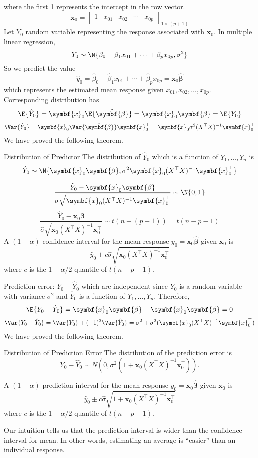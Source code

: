 where the first 1 represents the intercept in the row vector.
\[ \symbf{x}_0=\begin{bmatrix}
        1 & x_{01} & x_{02} & \cdots & x_{0p}
    \end{bmatrix}_{1\times (p+1)} \]
Let $ Y_0 $ random variable representing the response
associated with $ \symbf{x}_0 $. In multiple linear regression,
\[ Y_0 \sim \N{\beta_0+\beta_1x_{01}+\cdots+\beta_p x_{0p},\sigma^2} \]
So we predict the value
\[ \hat{y}_0=\hat{\beta}_0+\hat{\beta}_1x_{01}+\cdots+
    \hat{\beta}_p x_{0p}=\symbf{x}_0\hat{\symbf{\beta}} \]
which represents the estimated mean response given
$ x_{01},x_{02},\ldots,x_{0p} $. Corresponding distribution
has
\[ \E{\hat{Y}_0}=\symbf{x}_0\E{\hat{\symbf{\beta}}}=\symbf{x}_0\symbf{\beta}
    =\E{Y_0} \]
\[ \Var{\hat{Y}_0}=\symbf{x}_0\Var{\hat{\symbf{\beta}}}\symbf{x}_0^\top=
    \symbf{x}_0\sigma^2(X^\top X)^{-1}\symbf{x}_0^\top \]
We have proved the following theorem.
\begin{Theorem}{Distribution of Predictor}{}
    The distribution of $ \hat{Y}_0 $ which is a function
    of $ Y_1,\ldots,Y_n $ is
    \[ \hat{Y}_0 \sim \N{\symbf{x}_0\symbf{\beta},\sigma^2\symbf{x}_0(X^\top X)^{-1}
            \symbf{x}_0^\top} \]
\end{Theorem}
\[ \frac{\hat{Y}_0-\symbf{x}_0\symbf{\beta}}{\sigma\sqrt{
            \symbf{x}_0(X^\top X)^{-1}\symbf{x}_0^\top
        }}\sim \N{0,1}  \]
\[ \frac{\hat{Y}_0-\symbf{x}_0\symbf{\beta}}{\hat{\sigma}\sqrt{
            \symbf{x}_0(X^\top X)^{-1}\symbf{x}_0^\top
        }}\sim t(n-(p+1))=t(n-p-1)  \]
A $ (1-\alpha) $ confidence interval for the mean
response $ y_0=\symbf{x}_0\hat{\symbf{\beta}} $ given $ \symbf{x}_0 $ is
\[ \hat{y}_0\pm c \hat{\sigma}\sqrt{
        \symbf{x}_0(X^\top X)^{-1}\symbf{x}_0^\top} \]
where $ c $ is the $ 1-\alpha/2 $ quantile of $ t(n-p-1) $.

Prediction error: $ Y_0-\hat{Y}_0 $ which are independent
since $ Y_0 $ is a random variable with variance $ \sigma^2 $
and $ \hat{Y}_0 $ is a function of $ Y_1,\ldots,Y_n $. Therefore,
\[ \E{Y_0-\hat{Y}_0}=\symbf{x}_0\symbf{\beta}-\symbf{x}_0\symbf{\beta}=0 \]
\[ \Var{Y_0-\hat{Y}_0}=\Var{Y_0}+(-1)^2\Var{\hat{Y}_0}=
    \sigma^2+\sigma^2(\symbf{x}_0(X^\top X)^{-1}\symbf{x}_0^\top) \]
We have proved the following theorem.
\begin{Theorem}{Distribution of Prediction Error}{}
    The distribution of the prediction error is
    \[ Y_0-\hat{Y}_0 \sim N(
        0,\sigma^2(1+\symbf{x}_0(X^\top X)^{-1}\symbf{x}_0^\top)). \]
\end{Theorem}

A $ (1-\alpha) $ prediction interval for the mean
response $ y_0=\symbf{x}_0\hat{\symbf{\beta}} $ given $ \symbf{x}_0 $ is
\[ \hat{y}_0\pm c\hat{\sigma}\sqrt{1+\symbf{x}_0(X^\top X)^{-1}\symbf{x}_0^\top} \]
where $ c $ is the $ 1-\alpha/2 $ quantile of $ t(n-p-1) $.

\begin{Remark}{}{}
    Our intuition tells us that the prediction interval is wider than
    the confidence interval for mean. In other words, estimating
    an average is ``easier'' than an individual response.
\end{Remark}
